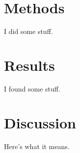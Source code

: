 \documentclass[12pt,]{book}
\theoremstyle{definition}
\theoremstyle{definition}
\theoremstyle{definition}
\theoremstyle{remark}
\begin{document}
\section{Methods}\label{methods-1}

I did some stuff.

\section{Results}\label{results-1}

I found some stuff.

\section{Discussion}\label{discussion-1}

Here's what it means.
\end{document}
